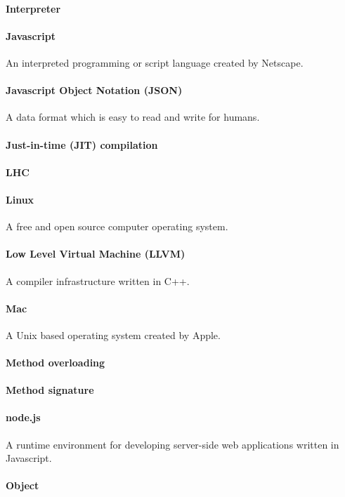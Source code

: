 \paragraph{Interpreter}
\paragraph{Javascript}
An interpreted programming or script language created by Netscape.
\paragraph{Javascript Object Notation (JSON)}
A data format which is easy to read and write for humans.
\paragraph{Just-in-time (JIT) compilation}
\paragraph{LHC}
\paragraph{Linux}
A free and open source computer operating system.
\paragraph{Low Level Virtual Machine (LLVM)}
A compiler infrastructure written in C++.
\paragraph{Mac}
A Unix based operating system created by Apple.
\paragraph{Method overloading}

\paragraph{Method signature}

\paragraph{node.js}
A runtime environment for developing server-side web applications written in Javascript. 

\paragraph{Object}


